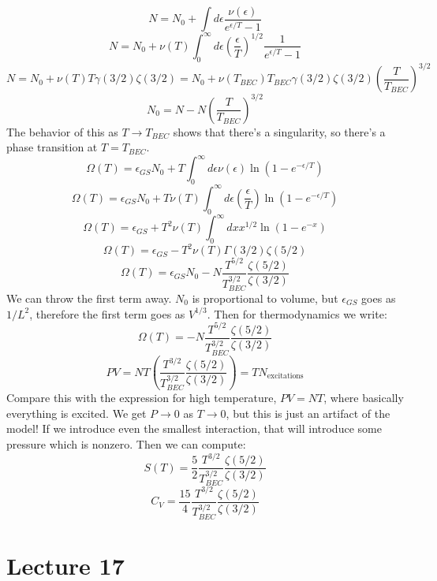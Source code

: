 \documentclass[12 pt]{article}
\begin{document}
\[   N = N_0 + \int d\epsilon \frac{\nu(\epsilon)}{e^{\epsilon/T} - 1}   \]
\[    N = N_0 + \nu(T)   \int_0^{\infty} d \epsilon   \left( \frac{\epsilon}{T}  \right)^{1/2} \frac{1}{e^{\epsilon  / T} - 1}   \]
\[    N = N_0 + \nu(T) T \gamma(3/2) \zeta(3/2)   =   N_0 + \nu(T_{BEC}) T_{BEC} \gamma(3/2) \zeta(3/2)  \left( \frac{T}{T_{BEC}} \right)^{3/2}  \]
\[   N_0 = N - N  \left( \frac{T}{T_{BEC}} \right)^{3/2}   \]
The behavior of this as $T\to T_{BEC}$ shows that there's a singularity, so there's a phase transition at $T = T_{BEC}$.
\[      \Omega(T) = \epsilon_{GS} N_0  + T \int_0^{\infty} d\epsilon \nu(\epsilon) \ln(1 - e^{-\epsilon/T})   \]
\[      \Omega(T) = \epsilon_{GS} N_0  + T \nu(T) \int_0^{\infty} d\epsilon \left( \frac{\epsilon}{T} \right) \ln(1 - e^{-\epsilon/T})     \]
\[     \Omega(T) = \epsilon_{GS}  + T^2 \nu(T) \int_0^{\infty} dx x^{1/2} \ln(1 - e^{-x})  \]
\[      \Omega(T) = \epsilon_{GS}  - T^2 \nu(T)  \Gamma(3/2) \zeta(5/2)   \]
\[      \Omega(T) = \epsilon_{GS} N_0 - N \frac{T^{5/2}}{T_{BEC}^{3/2}} \frac{\zeta(5/2)}{\zeta(3/2)}     \]
We can throw the first term away. $N_0$ is proportional to volume, but $\epsilon_{GS}$ goes as $1/L^2$, therefore the first term goes as $V^{1/3}$. Then for thermodynamics we write:
\[     \Omega(T) = -  N \frac{T^{5/2}}{T_{BEC}^{3/2}} \frac{\zeta(5/2)}{\zeta(3/2)}    \]
\[      PV = NT \left(  \frac{T^{3/2}}{T_{BEC}^{3/2}} \frac{\zeta(5/2)}{\zeta(3/2)}  \right)   = T N_{\text{excitations}}   \]
Compare this with the expression for high temperature, $PV = NT$, where basically everything is excited. We get $P\to 0$ as $T\to 0$, but this is just an artifact of the model! If we introduce even the smallest interaction, that will introduce some pressure which is nonzero. Then we can compute:
\[       S(T) = \frac{5}{2}    \frac{T^{3/2}}{T_{BEC}^{3/2}} \frac{\zeta(5/2)}{\zeta(3/2)}   \]
\[    C_V =    \frac{15}{4}    \frac{T^{3/2}}{T_{BEC}^{3/2}} \frac{\zeta(5/2)}{\zeta(3/2)}  \]



\section*{Lecture 17}
\end{document}
